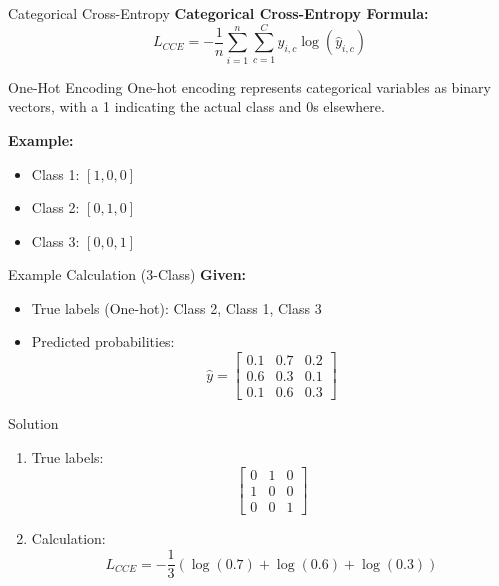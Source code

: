 \documentclass[serif, aspectratio=169]{beamer}
\begin{document}
\begin{frame}{Categorical Cross-Entropy}
    \textbf{Categorical Cross-Entropy Formula:}
    \[
    L_{CCE} = - \frac{1}{n} \sum_{i=1}^{n} \sum_{c=1}^{C} y_{i,c} \log(\hat{y}_{i,c})
    \]
\end{frame}

\begin{frame}{One-Hot Encoding}
    One-hot encoding represents categorical variables as binary vectors, with a 1 indicating the actual class and 0s elsewhere.
    
    \textbf{Example:} \\
    \begin{itemize}
        \item Class 1: \([1, 0, 0]\)
        \item Class 2: \([0, 1, 0]\)
        \item Class 3: \([0, 0, 1]\)
    \end{itemize}
\end{frame}

\begin{frame}{Example Calculation (3-Class)}
    \textbf{Given:}
    \begin{itemize}
        \item True labels (One-hot): Class 2, Class 1, Class 3
        \item Predicted probabilities:
        \[
        \hat{y} = \begin{bmatrix} 
        0.1 & 0.7 & 0.2 \\ 
        0.6 & 0.3 & 0.1 \\ 
        0.1 & 0.6 & 0.3 
        \end{bmatrix}
        \]
    \end{itemize}
\end{frame}

\begin{frame}{Solution}
    \begin{enumerate}
        \item True labels:
        \[
        \begin{bmatrix} 
        0 & 1 & 0 \\ 
        1 & 0 & 0 \\ 
        0 & 0 & 1 
        \end{bmatrix}
        \]
        \item Calculation:
        \[
        L_{CCE} = -\frac{1}{3} \left( \log(0.7) + \log(0.6) + \log(0.3) \right)
        \]
    \end{enumerate}
\end{frame}
\end{document}
